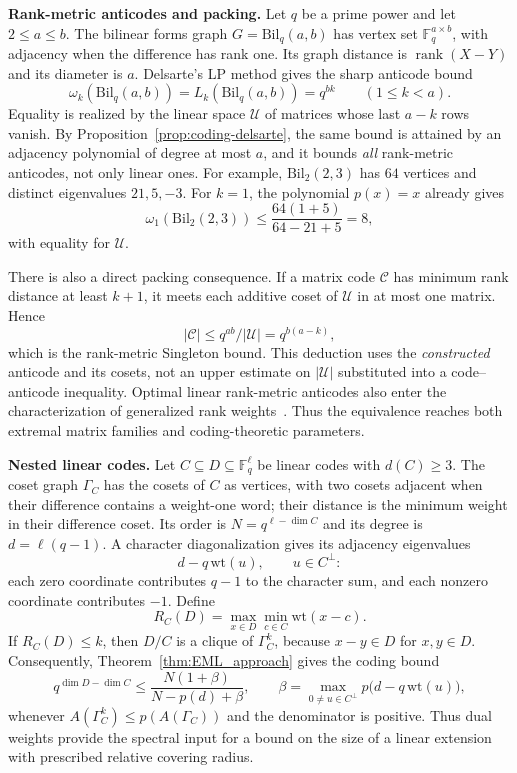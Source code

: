 \documentclass[10pt,a4paper]{article}
\theoremstyle{plain}
\numberwithin{equation}{section}
\begin{document}
\medskip
\textbf{Rank-metric anticodes and packing.}
Let $q$ be a prime power and let $2\le a\le b$. The bilinear forms graph $G=\mathrm{Bil}_q(a,b)$ has vertex set $\mathbb F_q^{a\times b}$, with adjacency when the difference has rank one. Its graph distance is $\operatorname{rank}(X-Y)$ and its diameter is $a$. Delsarte's LP method gives the sharp anticode bound~\cite{Delsarte_1978,Tanaka_2006,Tanaka_2012}
\begin{equation}\label{eq:coding-rank}
 \omega_k(\mathrm{Bil}_q(a,b))=L_k(\mathrm{Bil}_q(a,b))=q^{bk}
 \qquad(1\le k<a).
\end{equation}
Equality is realized by the linear space $\mathcal U$ of matrices whose last $a-k$ rows vanish. By Proposition~\ref{prop:coding-delsarte}, the same bound is attained by an adjacency polynomial of degree at most $a$, and it bounds \emph{all} rank-metric anticodes, not only linear ones. For example, $\mathrm{Bil}_2(2,3)$ has $64$ vertices and distinct eigenvalues $21,5,-3$. For $k=1$, the polynomial $p(x)=x$ already gives
\[
 \omega_1(\mathrm{Bil}_2(2,3))\le
 \frac{64(1+5)}{64-21+5}=8,
\]
with equality for $\mathcal U$.

There is also a direct packing consequence. If a matrix code $\mathcal C$ has minimum rank distance at least $k+1$, it meets each additive coset of $\mathcal U$ in at most one matrix. Hence
\[
 |\mathcal C|\le q^{ab}/|\mathcal U|=q^{b(a-k)},
\]
which is the rank-metric Singleton bound. This deduction uses the \emph{constructed} anticode and its cosets, not an upper estimate on $|\mathcal U|$ substituted into a code--anticode inequality. Optimal linear rank-metric anticodes also enter the characterization of generalized rank weights~\cite{Ravagnani_2016}. Thus the equivalence reaches both extremal matrix families and coding-theoretic parameters.
 

\medskip
\textbf{Nested linear codes.}
Let $C\subseteq D\subseteq\mathbb F_q^\ell$ be linear codes with
$d(C)\ge3$. The coset graph $\Gamma_C$ has the cosets of $C$ as vertices,
with two cosets adjacent when their difference contains a weight-one
word; their distance is the minimum weight in their difference coset.
Its order is $N=q^{\ell-\dim C}$ and its degree is $d=\ell(q-1)$.
A character diagonalization gives its adjacency eigenvalues
\[
 d-q\,\mathrm{wt}(u),\qquad u\in C^\perp:
\]
each zero coordinate contributes $q-1$ to the character sum, and each
nonzero coordinate contributes $-1$. Define
\[
 R_C(D)=\max_{x\in D}\min_{c\in C}\mathrm{wt}(x-c).
\]
If $R_C(D)\le k$, then $D/C$ is a clique of $\Gamma_C^k$, because
$x-y\in D$ for $x,y\in D$. Consequently,
Theorem~\ref{thm:EML_approach} gives the coding bound
\begin{equation}\label{eq:coding-nested}
 q^{\dim D-\dim C}\le
 \frac{N(1+\beta)}{N-p(d)+\beta},\qquad
 \beta=\max_{0\ne u\in C^\perp}p\bigl(d-q\,\mathrm{wt}(u)\bigr),
\end{equation}
whenever $A(\Gamma_C^k)\le p(A(\Gamma_C))$ and the denominator is positive.
Thus dual weights provide the spectral input for a bound on the size of
a linear extension with prescribed relative covering radius.
\end{document}
